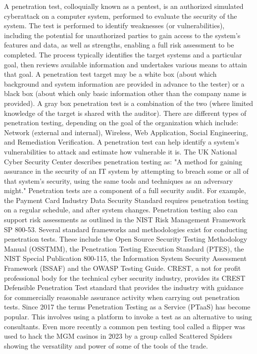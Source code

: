 A penetration test, colloquially known as a pentest, is an authorized simulated cyberattack on a computer system, performed to evaluate the security of the system. The test is performed to identify weaknesses (or vulnerabilities), including the potential for unauthorized parties to gain access to the system's features and data, as well as strengths, enabling a full risk assessment to be completed.
The process typically identifies the target systems and a particular goal, then reviews available information and undertakes various means to attain that goal. A penetration test target may be a white box (about which background and system information are provided in advance to the tester) or a black box (about which only basic information other than the company name is provided). A gray box penetration test is a combination of the two (where limited knowledge of the target is shared with the auditor). There are different types of penetration testing, depending on the goal of the organization which include: Network (external and internal), Wireless, Web Application, Social Engineering, and Remediation Verification. A penetration test can help identify a system's vulnerabilities to attack and estimate how vulnerable it is.
The UK National Cyber Security Center describes penetration testing as: "A method for gaining assurance in the security of an IT system by attempting to breach some or all of that system's security, using the same tools and techniques as an adversary might." Penetration tests are a component of a full security audit. For example, the Payment Card Industry Data Security Standard requires penetration testing on a regular schedule, and after system changes. Penetration testing also can support risk assessments as outlined in the NIST Risk Management Framework SP 800-53.
Several standard frameworks and methodologies exist for conducting penetration tests. These include the Open Source Security Testing Methodology Manual (OSSTMM), the Penetration Testing Execution Standard (PTES), the NIST Special Publication 800-115, the Information System Security Assessment Framework (ISSAF) and the OWASP Testing Guide. CREST, a not for profit professional body for the technical cyber security industry, provides its CREST Defensible Penetration Test standard that provides the industry with guidance for commercially reasonable assurance activity when carrying out penetration tests.
Since 2017 the terms Penetration Testing as a Service (PTaaS)  has become popular. This involves using a platform to invoke a test as an alternative to using consultants.
Even more recently a common pen testing tool called a flipper was used to hack the MGM casinos in 2023 by a group called Scattered Spiders showing the versatility and power of some of the tools of the trade.


